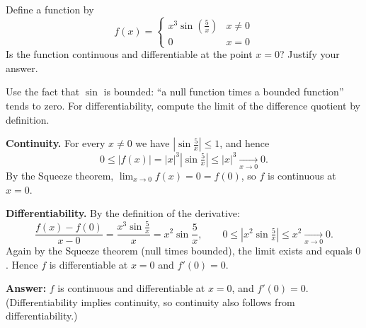 
\begin{question}
Define a function by
\[ f(x) = \begin{cases} x^3 \sin(\frac{5}{x}) & x \ne 0 \\ 0 & x = 0 \end{cases} \]
Is the function continuous and differentiable at the point $x = 0$? Justify your answer.
\end{question}

\begin{hint}
Use the fact that $\sin$ is bounded: ``a null function times a bounded function'' tends to zero. For differentiability, compute the limit of the difference quotient by definition.
\end{hint}

\begin{solution}
\textbf{Continuity.} For every $x \ne 0$ we have $\left|\sin\frac{5}{x}\right| \le 1$, and hence
\[ 0 \le |f(x)| = |x|^3\left|\sin\tfrac{5}{x}\right| \le |x|^3 \xrightarrow[x\to0]{} 0. \]
By the Squeeze theorem, $\lim_{x\to0} f(x) = 0 = f(0)$, so $f$ is continuous at $x = 0$.

\textbf{Differentiability.} By the definition of the derivative:
\[ \frac{f(x) - f(0)}{x - 0} = \frac{x^3\sin\frac5x}{x} = x^2\sin\frac5x, \qquad 0 \le \left| x^2 \sin\tfrac5x \right| \le x^2 \xrightarrow[x\to0]{} 0. \]
Again by the Squeeze theorem (null times bounded), the limit exists and equals $0$. Hence $f$ is differentiable at $x = 0$ and $f'(0) = 0$.

\textbf{Answer:} $f$ is continuous and differentiable at $x = 0$, and $f'(0) = 0$. (Differentiability implies continuity, so continuity also follows from differentiability.)
\end{solution}
